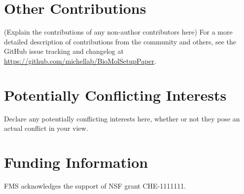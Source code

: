 \documentclass[9pt,bestpractices]{livecoms}
\newcommand{\githubrepository}{\url{https://github.com/michellab/BioMolSetupPaper}}  %
\begin{document}
\section*{Other Contributions}
%

(Explain the contributions of any non-author contributors here)
For a more detailed description of contributions from the community and others, see the GitHub issue tracking and changelog at \githubrepository.

\section*{Potentially Conflicting Interests}

Declare any potentially conflicting interests here, whether or not they pose an actual conflict in your view.

\section*{Funding Information}
FMS acknowledges the support of NSF grant CHE-1111111.




\end{document}
